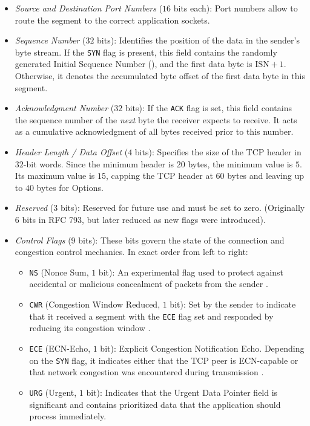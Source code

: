\begin{itemize}
    \item \emph{Source and Destination Port Numbers} (\( 16 \) bits each): Port numbers allow to route the segment to the correct application sockets.
    \item \emph{Sequence Number} (\( 32 \) bits): Identifies the position of the data in the sender's byte stream. If the \texttt{SYN} flag is present, this field contains the randomly generated Initial Sequence Number (), and the first data byte is \(\text{ISN} + 1\). Otherwise, it denotes the accumulated byte offset of the first data byte in this segment.
    \item \emph{Acknowledgment Number} (\( 32 \) bits): If the \texttt{ACK} flag is set, this field contains the sequence number of the \emph{next} byte the receiver expects to receive. It acts as a cumulative acknowledgment of all bytes received prior to this number.
    \item \emph{Header Length / Data Offset} (\( 4 \) bits): Specifies the size of the TCP header in \( 32 \)-bit words. Since the minimum header is \( 20 \) bytes, the minimum value is \( 5 \). Its maximum value is \( 15 \), capping the TCP header at \( 60 \) bytes and leaving up to \( 40 \) bytes for Options.
    \item \emph{Reserved} (\( 3 \) bits): Reserved for future use and must be set to zero. (Originally \( 6 \) bits in RFC 793, but later reduced as new flags were introduced).
    \item \emph{Control Flags} (\( 9 \) bits): These bits govern the state of the connection and congestion control mechanics. In exact order from left to right:
    \begin{itemize}
        \item \texttt{NS} (Nonce Sum, \( 1 \) bit): An experimental flag used to protect against accidental or malicious concealment of packets from the sender \cite{rfc3540}.
        \item \texttt{CWR} (Congestion Window Reduced, \( 1 \) bit): Set by the sender to indicate that it received a segment with the \texttt{ECE} flag set and responded by reducing its congestion window \cite{rfc3168}.
        \item \texttt{ECE} (ECN-Echo, \( 1 \) bit): Explicit Congestion Notification Echo. Depending on the \texttt{SYN} flag, it indicates either that the TCP peer is ECN-capable or that network congestion was encountered during transmission \cite{rfc3168}.
        \item \texttt{URG} (Urgent, \( 1 \) bit): Indicates that the Urgent Data Pointer field is significant and contains prioritized data that the application should process immediately.

\end{itemize}
\end{itemize}
